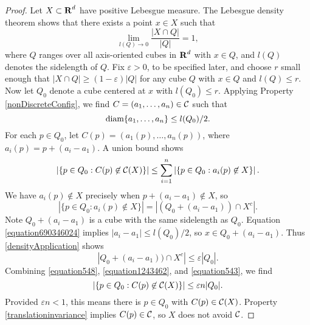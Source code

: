 \begin{proof}
	Let $X \subset \operatorname{\mathbf{R}}^d$ have positive Lebesgue measure. The Lebesgue density theorem shows that there exists a point $x \in X$ such that
	\begin{equation} \label{densityApplication} \lim_{l(Q) \to 0} \frac{|X \cap Q|}{|Q|} = 1, \end{equation}
	where $Q$ ranges over all axis-oriented cubes in $\operatorname{\mathbf{R}}^d$ with $x \in Q$, and $l(Q)$ denotes the sidelength of $Q$. Fix $\varepsilon > 0$, to be specified later, and choose $r$ small enough that $|X \cap Q| \geq (1 - \varepsilon) |Q|$ for any cube $Q$ with $x \in Q$ and $l(Q) \leq r$. Now let $Q_0$ denote a cube centered at $x$ with $l(Q_0) \leq r$. Applying Property \ref{nonDiscreteConfig}, we find $C = (a_1, \dots, a_n) \in \operatorname{\mathcal{C}}$ such that
	\begin{equation} \label{equation690346024} \operatorname{\text{diam}} \{ a_1, \dots, a_n \} \leq l(Q_0)/2. \end{equation}
	For each $p \in Q_0$, let $C(p) = (a_1(p), \dots, a_n(p))$, where $a_i(p) = p + (a_i - a_1)$. A union bound shows
	\begin{equation} \label{equation548} \left| \{ p \in Q_0 : C(p) \not \in \operatorname{\mathcal{C}}(X) \} \right| \leq \sum_{i = 1}^n \left| \{ p \in Q_0 : a_i(p) \not \in X \} \right|.
	\end{equation}
	We have $a_i(p) \not \in X$ precisely when $p + (a_i - a_1) \not \in X$, so
	\begin{equation} \label{equation1243462}
		|\{ p \in Q_0 : a_i(p) \not \in X \}| = |(Q_0 + (a_i - a_1)) \cap X^c|.
	\end{equation}
	Note $Q_0 + (a_i - a_1)$ is a cube with the same sidelength as $Q_0$. Equation \eqref{equation690346024} implies $|a_i - a_1| \leq l(Q_0)/2$, so $x \in Q_0 + (a_i - a_1)$. Thus \eqref{densityApplication} shows
	\begin{equation} \label{equation543} |Q_0 + (a_i - a_1)) \cap X^c| \leq \varepsilon |Q_0|. \end{equation}
	Combining \eqref{equation548}, \eqref{equation1243462}, and \eqref{equation543}, we find
	\[ \left| \{ p \in Q_0 : C(p) \not \in \operatorname{\mathcal{C}}(X) \} \right| \leq \varepsilon n |Q_0|. \]
	Provided $\varepsilon n < 1$, this means there is $p \in Q_0$ with $C(p) \in \operatorname{\mathcal{C}}(X)$. Property \ref{translationinvariance} implies $C(p) \in \operatorname{\mathcal{C}}$, so $X$ does not avoid $\operatorname{\mathcal{C}}$.
\end{proof}


